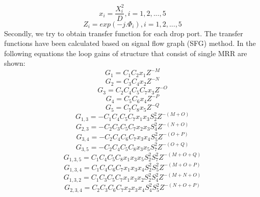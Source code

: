 \documentclass{osa-article}
\begin{document}
 \begin{equation}
x_i=\frac{X^2_i}{D}, i=1, 2, ..., 5
\label{eqa20}
\end{equation}
 \begin{equation}
Z_i=exp(-j.\Phi_i), i=1, 2, ..., 5
\label{eqa21}
\end{equation}
Secondly, we try to obtain transfer function for each drop port. The transfer functions have been calculated based on signal flow graph (SFG) method. In the following equations the loop gains of structure that consist of single MRR are shown:
 \begin{equation}
G_1=C_1C_2x_1Z^{-M}
\label{eqa22}
\end{equation}
 \begin{equation}
G_2=C_3C_4x_2Z^{-N}
\label{eqa23}
\end{equation}
 \begin{equation}
G_3=C_2C_4C_5C_7x_3Z^{-O}
\label{eqa24}
\end{equation}
 \begin{equation}
G_4=C_5C_6x_4Z^{-P}
\label{eqa25}
\end{equation}
 \begin{equation}
G_5=C_7C_8x_5Z^{-Q}
\label{eqa26}
\end{equation}
 \begin{equation}
G_{1,3}=-C_1C_4C_5C_7x_1x_3{S^2_2}Z^{-(M+O)}
\label{eqa27}
\end{equation}
 \begin{equation}
G_{2,3}=-C_2C_3C_5C_7x_2x_3{S^2_4}Z^{-(N+O)}
\label{eqa28}
\end{equation}
 \begin{equation}
G_{3,4}=-C_2C_4C_6C_7x_3x_4{S^2_5}Z^{-(O+P)}
\label{eqa29}
\end{equation}
 \begin{equation}
G_{3,5}=-C_2C_4C_5C_8x_3x_5{S^2_7}Z^{-(O+Q)}
\label{eqa30}
\end{equation}
 \begin{equation}
G_{1,3,5}=C_1C_4C_5C_8x_1x_3x_5{S^2_2}{S^2_7}Z^{-(M+O+Q)}
\label{eqa31}
\end{equation}
 \begin{equation}
G_{1,3,4}=C_1C_4C_6C_7x_1x_3x_4{S^2_2}{S^2_5}Z^{-(M+O+P)}
\label{eqa32}
\end{equation}
 \begin{equation}
G_{1,3,2}=C_1C_3C_5C_7x_1x_3x_2{S^2_2}{S^2_4}Z^{-(M+N+O)}
\label{eqa33}
\end{equation}
 \begin{equation}
G_{2,3,4}=C_2C_3C_6C_7x_2x_3x_4{S^2_4}{S^2_5}Z^{-(N+O+P)}
\label{eqa34}
\end{equation}
\end{document}
